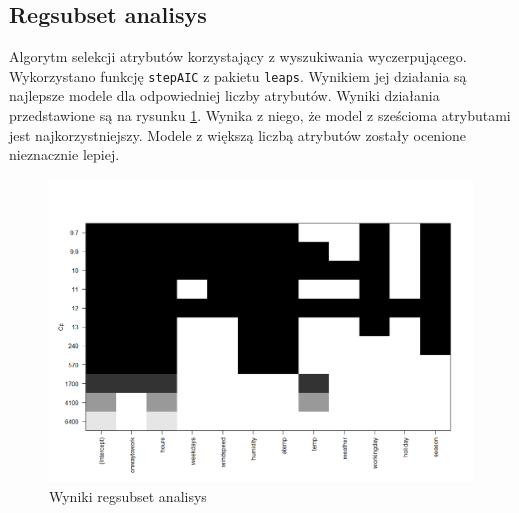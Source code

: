 \documentclass[a4paper,12pt]{article}
\begin{document}
    \subsection{Regsubset analisys}
        Algorytm selekcji atrybutów korzystający z wyszukiwania wyczerpującego. Wykorzystano funkcję \texttt{stepAIC} z pakietu \texttt{leaps}. Wynikiem jej działania są najlepsze modele dla odpowiedniej liczby atrybutów. Wyniki działania przedstawione są na rysunku \ref{fig:regsubset}. Wynika z niego, że model z sześcioma atrybutami jest najkorzystniejszy. Modele z większą liczbą atrybutów zostały ocenione nieznacznie lepiej.
        \begin{figure}[h]
            \centering
            \includegraphics[width=\linewidth]{regsubsetanalysis}
            \caption{Wyniki regsubset analisys}
            \label{fig:regsubset}
        \end{figure}
        
\end{document}
